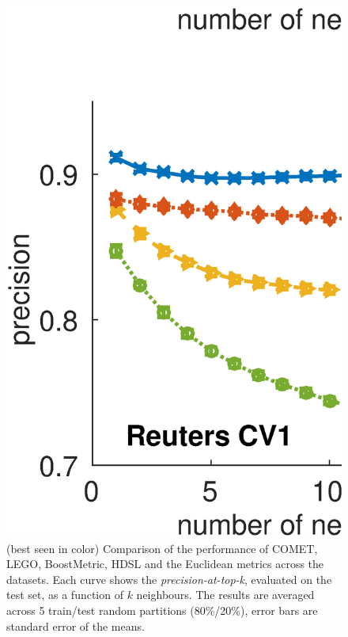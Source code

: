 \documentclass{article}
\begin{document}
\begin{figure}[!h]
\vskip 0.2in
\begin{center}
\centerline{\includegraphics[width=\columnwidth]{Precision_at_K_all_datasets}}
\caption{ (best seen in color) Comparison of the performance of COMET, LEGO, BoostMetric, HDSL and the Euclidean metrics across the datasets. Each curve shows the \textit{precision-at-top-k}, evaluated on the test set, as a function of $k$ neighbours. The results are averaged across 5 train/test random partitions (80\%/20\%), error bars are standard error of the means.}
\label{precFig}
\end{center}
\vskip -0.2in
\end{figure} 
\end{document}
